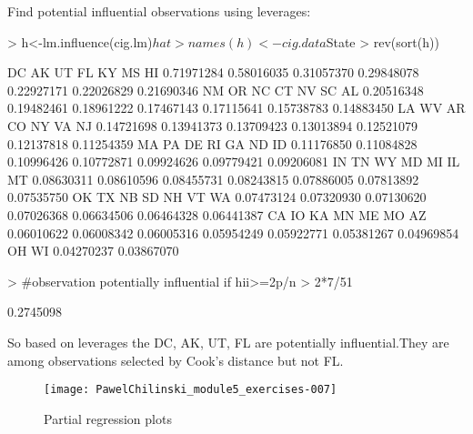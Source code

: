 \documentclass[a4paper]{article}
\begin{document}
\begin{itemize}
Find potential influential observations using leverages:
\begin{Schunk}
\begin{Sinput}
> h<-lm.influence(cig.lm)$hat
> names(h)<-cig.data$State
> rev(sort(h))
\end{Sinput}
\begin{Soutput}
        DC         AK         UT         FL         KY         MS         HI 
0.71971284 0.58016035 0.31057370 0.29848078 0.22927171 0.22026829 0.21690346 
        NM         OR         NC         CT         NV         SC         AL 
0.20516348 0.19482461 0.18961222 0.17467143 0.17115641 0.15738783 0.14883450 
        LA         WV         AR         CO         NY         VA         NJ 
0.14721698 0.13941373 0.13709423 0.13013894 0.12521079 0.12137818 0.11254359 
        MA         PA         DE         RI         GA         ND         ID 
0.11176850 0.11084828 0.10996426 0.10772871 0.09924626 0.09779421 0.09206081 
        IN         TN         WY         MD         MI         IL         MT 
0.08630311 0.08610596 0.08455731 0.08243815 0.07886005 0.07813892 0.07535750 
        OK         TX         NB         SD         NH         VT         WA 
0.07473124 0.07320930 0.07130620 0.07026368 0.06634506 0.06464328 0.06441387 
        CA         IO         KA         MN         ME         MO         AZ 
0.06010622 0.06008342 0.06005316 0.05954249 0.05922771 0.05381267 0.04969854 
        OH         WI 
0.04270237 0.03867070 
\end{Soutput}
\begin{Sinput}
> #observation potentially influential if hii>=2p/n
> 2*7/51
\end{Sinput}
\begin{Soutput}
[1] 0.2745098
\end{Soutput}
\end{Schunk}
So based on leverages the DC, AK, UT, FL are potentially influential.They are
among observations selected by Cook's distance but not FL. 
\begin{figure}[H]
\begin{center}
\begin{Schunk}
\end{Schunk}
\texttt{[image: PawelChilinski\_module5\_exercises-007]}
\caption{Partial regression plots}
\end{center}
\end{figure}

\end{itemize}
\end{document}
